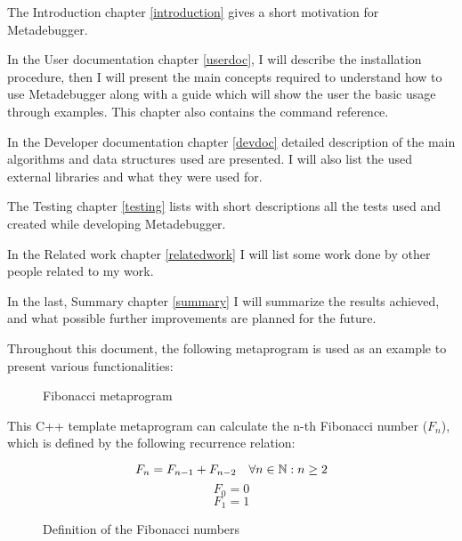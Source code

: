 The Introduction chapter \ref{introduction} gives a short motivation for
Metadebugger.

In the User documentation chapter \ref{userdoc}, I will describe the
installation procedure, then I will present the main concepts required to
understand how to use Metadebugger along with a guide which will show the user
the basic usage through examples. This chapter also contains the command
reference.

In the Developer documentation chapter \ref{devdoc} detailed description of the
main algorithms and data structures used are presented. I will also list the
used external libraries and what they were used for.

The Testing chapter \ref{testing} lists with short descriptions all the tests
used and created while developing Metadebugger.

In the Related work chapter \ref{relatedwork} I will list some work done by
other people related to my work.

In the last, Summary chapter \ref{summary} I will summarize the results
achieved, and what possible further improvements are planned for the future.

Throughout this document, the following metaprogram is used as an example to
present various functionalities:

\begin{figure}[H]
    \caption{Fibonacci metaprogram}
\end{figure}

This C++ template metaprogram can calculate the n-th Fibonacci number
(\(F_n\)), which is defined by the following recurrence relation:

\begin{figure}[H]
    \[
        F_n = F_{n-1} + F_{n-2} \quad \forall n \in \mathbb{N}: n \geq 2 \\
    \]
    \[
        F_0 = 0
    \]
    \[
        F_1 = 1
    \]
    \caption{Definition of the Fibonacci numbers}
\end{figure}
